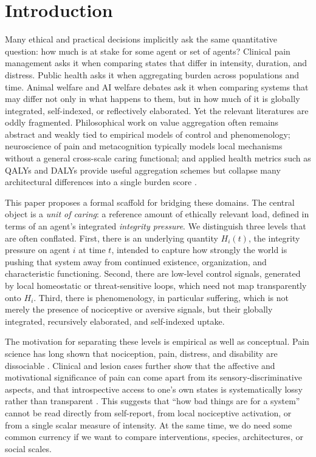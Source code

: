 \documentclass[11pt]{article}
\begin{document}
\section{Introduction}

Many ethical and practical decisions implicitly ask the same quantitative question: how much is at stake for some agent or set of agents? Clinical pain management asks it when comparing states that differ in intensity, duration, and distress. Public health asks it when aggregating burden across populations and time. Animal welfare and AI welfare debates ask it when comparing systems that may differ not only in what happens to them, but in how much of it is globally integrated, self-indexed, or reflectively elaborated. Yet the relevant literatures are oddly fragmented. Philosophical work on value aggregation often remains abstract and weakly tied to empirical models of control and phenomenology; neuroscience of pain and metacognition typically models local mechanisms without a general cross-scale caring functional; and applied health metrics such as QALYs and DALYs provide useful aggregation schemes but collapse many architectural differences into a single burden score \cite{whitehead2010qaly,murray1996globalburden,murray2013gbd,who_daly}.

This paper proposes a formal scaffold for bridging these domains. The central object is a \emph{unit of caring}: a reference amount of ethically relevant load, defined in terms of an agent’s integrated \emph{integrity pressure}. We distinguish three levels that are often conflated. First, there is an underlying quantity $H_i(t)$, the integrity pressure on agent $i$ at time $t$, intended to capture how strongly the world is pushing that system away from continued existence, organization, and characteristic functioning. Second, there are low-level control signals, generated by local homeostatic or threat-sensitive loops, which need not map transparently onto $H_i$. Third, there is phenomenology, in particular suffering, which is not merely the presence of nociceptive or aversive signals, but their globally integrated, recursively elaborated, and self-indexed uptake.

The motivation for separating these levels is empirical as well as conceptual. Pain science has long shown that nociception, pain, distress, and disability are dissociable \cite{melzack1965gate,melzack1975mpq,melzack2001neuromatrix}. Clinical and lesion cases further show that the affective and motivational significance of pain can come apart from its sensory-discriminative aspects, and that introspective access to one’s own states is systematically lossy rather than transparent \cite{schooler2002rerepresenting,fleming2014measure,maniscalco2012metad,gerrans2024pain}. This suggests that “how bad things are for a system” cannot be read directly from self-report, from local nociceptive activation, or from a single scalar measure of intensity. At the same time, we do need some common currency if we want to compare interventions, species, architectures, or social scales.
\end{document}
